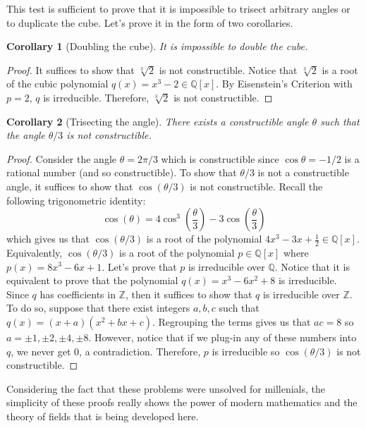 \documentclass{article}
\theoremstyle{plain}
\newtheorem*{corollary}{Corollary}
\theoremstyle{definition}
\newcommand{\Q}{\mathbb{Q}}
\newcommand{\Z}{\mathbb{Z}}
\begin{document}
This test is sufficient to prove that it is impossible to trisect arbitrary angles or to duplicate the cube. Let's prove it in the form of two corollaries.

\begin{corollary}[Doubling the cube]
    It is impossible to double the cube.
\end{corollary}

\begin{proof}
    It suffices to show that $\sqrt[3]{2}$ is not constructible. Notice that $\sqrt[3]{2}$ is a root of the cubic polynomial $q(x) = x^3 - 2 \in \Q[x]$. By Eisenstein's Criterion with $p=2$, $q$ is irreducible. Therefore, $\sqrt[3]{2}$ is not constructible.
\end{proof}

\begin{corollary}[Trisecting the angle]
    There exists a constructible angle $\theta$ such that the angle $\theta / 3$ is not constructible. 
\end{corollary}

\begin{proof}
    Consider the angle $\theta = 2\pi / 3$ which is constructible since $\cos \theta = -1/2$ is a rational number (and so constructible). To show that $\theta / 3$ is not a constructible angle, it suffices to show that $\cos(\theta / 3)$ is not constructible. Recall the following trigonometric identity:
    $$\cos(\theta) = 4 \cos^3 \left(\frac{\theta}{3}\right) - 3\cos \left(\frac{\theta}{3}\right)$$
    which gives us that $\cos(\theta / 3)$ is a root of the polynomial $4x^3 - 3x + \frac{1}{2} \in \Q[x]$. Equivalently, $\cos(\theta / 3)$ is a root of the polynomial $p \in \Q[x]$ where $p(x) = 8x^3 - 6x + 1$. Let's prove that $p$ is irreducible over $\Q$. Notice that it is equivalent to prove that the polynomial $q(x) = x^3 - 6x^2 + 8$ is irreducible. Since $q$ has coefficients in $\Z$, then it suffices to show that $q$ is irreducible over $\Z$. To do so, suppose that there exist integers $a,b,c$ such that $q(x) = (x + a)(x^2 + bx + c)$. Regrouping the terms gives us that $ac = 8$ so $a = \pm 1, \pm 2, \pm 4, \pm 8$. However, notice that if we plug-in any of these numbers into $q$, we never get 0, a contradiction. Therefore, $p$ is irreducible so $\cos(\theta / 3)$ is not constructible.  
\end{proof}

Considering the fact that these problems were unsolved for millenials, the simplicity of these proofs really shows the power of modern mathematics and the theory of fields that is being developed here.
\end{document}
